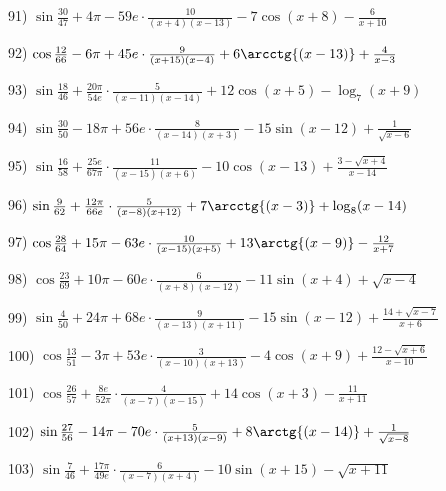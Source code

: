 \documentclass[11pt,ukrainian]{article}
\begin{document}
91) \space 
{ ${\sin\frac{30}{47}} + 4{\pi} - 59 e\cdot {\frac{10}{(x + 4)(x - 13)}} - {7\cos{(x + 8)}} - { \frac{6}{x + 10}}$}
\smallskip\par
92) \space 
{ ${\cos\frac{12}{66}} - 6{\pi} + 45 e\cdot {\frac{9}{(x + 15)(x - 4)}} + {6\arcctg{(x - 13)}} + { \frac{4}{x - 3}}$}
\smallskip\par
93) \space 
{ ${\sin\frac{18}{46}} + \frac{20{\pi}}{54 e}\cdot {\frac{5}{(x - 11)(x - 14)}} + {12\cos{(x + 5)}} - {\log_{7}(x + 9)}$}
\smallskip\par
94) \space 
{ ${\sin\frac{30}{50}} - 18{\pi} + 56 e\cdot {\frac{8}{(x - 14)(x + 3)}} - {15\sin{(x - 12)}} + {\frac{1}{\sqrt{x - 6}}}$}
\smallskip\par
95) \space 
{ ${\sin\frac{16}{58}} + \frac{25 e}{67{\pi}}\cdot {\frac{11}{(x - 15)(x + 6)}} - {10\cos{(x - 13)}} + {\frac{3 - \sqrt{x + 4}}{x - 14}}$}
\smallskip\par
96) \space 
{ ${\sin\frac{9}{62}} + \frac{12{\pi}}{66 e}\cdot {\frac{5}{(x - 8)(x + 12)}} + {7\arcctg{(x - 3)}} + {\log_{8}(x - 14)}$}
\smallskip\par
97) \space 
{ ${\cos\frac{28}{64}} + 15{\pi} - 63 e\cdot {\frac{10}{(x - 15)(x + 5)}} + {13\arctg{(x - 9)}} - { \frac{12}{x + 7}}$}
\smallskip\par
98) \space 
{ ${\cos\frac{23}{69}} + 10{\pi} - 60 e\cdot {\frac{6}{(x + 8)(x - 12)}} - {11\sin{(x + 4)}} + {\sqrt{x - 4}}$}
\smallskip\par
99) \space 
{ ${\sin\frac{4}{50}} + 24{\pi} + 68 e\cdot {\frac{9}{(x - 13)(x + 11)}} - {15\sin{(x - 12)}} + {\frac{14 + \sqrt{x - 7}}{x + 6}}$}
\smallskip\par
100) \space 
{ ${\cos\frac{13}{51}} - 3{\pi} + 53 e\cdot {\frac{3}{(x - 10)(x + 13)}} - {4\cos{(x + 9)}} + {\frac{12 - \sqrt{x + 6}}{x - 10}}$}
\smallskip\par
101) \space 
{ ${\cos\frac{26}{57}} + \frac{8 e}{52{\pi}}\cdot {\frac{4}{(x - 7)(x - 15)}} + {14\cos{(x + 3)}} - { \frac{11}{x + 11}}$}
\smallskip\par
102) \space 
{ ${\sin\frac{27}{56}} - 14{\pi} - 70 e\cdot {\frac{5}{(x + 13)(x - 9)}} + {8\arctg{(x - 14)}} + {\frac{1}{\sqrt{x - 8}}}$}
\smallskip\par
103) \space 
{ ${\sin\frac{7}{46}} + \frac{17{\pi}}{49 e}\cdot {\frac{6}{(x - 7)(x + 4)}} - {10\sin{(x + 15)}} - {\sqrt{x + 11}}$}
\smallskip\par
\end{document}
